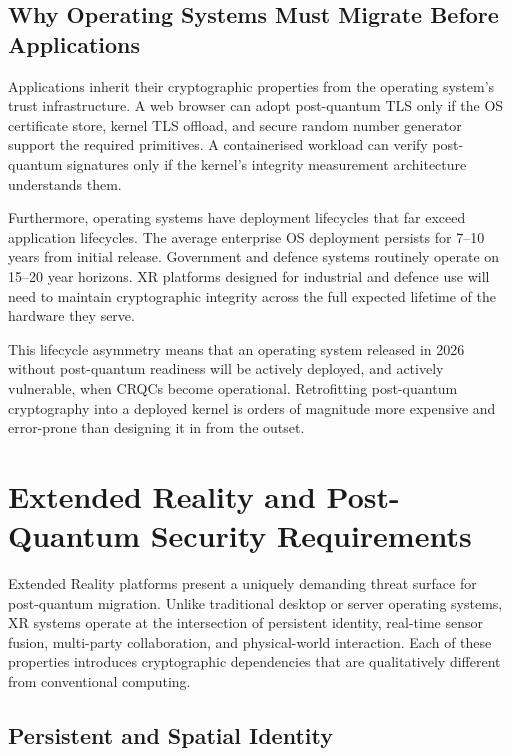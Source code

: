 \documentclass[11pt, a4paper]{article}
\begin{document}
\subsection{Why Operating Systems Must Migrate Before Applications}\label{sec:os-migration-urgency}

Applications inherit their cryptographic properties from the operating system's trust infrastructure. A web browser can adopt post-quantum TLS only if the OS certificate store, kernel TLS offload, and secure random number generator support the required primitives. A containerised workload can verify post-quantum signatures only if the kernel's integrity measurement architecture understands them.

Furthermore, operating systems have deployment lifecycles that far exceed application lifecycles. The average enterprise OS deployment persists for 7--10 years from initial release. Government and defence systems routinely operate on 15--20 year horizons. XR platforms designed for industrial and defence use will need to maintain cryptographic integrity across the full expected lifetime of the hardware they serve.

This lifecycle asymmetry means that an operating system released in 2026 without post-quantum readiness will be actively deployed, and actively vulnerable, when CRQCs become operational. Retrofitting post-quantum cryptography into a deployed kernel is orders of magnitude more expensive and error-prone than designing it in from the outset.



\section{Extended Reality and Post-Quantum Security Requirements}\label{sec:xr-pqc}

Extended Reality platforms present a uniquely demanding threat surface for post-quantum migration. Unlike traditional desktop or server operating systems, XR systems operate at the intersection of persistent identity, real-time sensor fusion, multi-party collaboration, and physical-world interaction. Each of these properties introduces cryptographic dependencies that are qualitatively different from conventional computing.

\subsection{Persistent and Spatial Identity}\label{sec:xr-identity}
\end{document}
